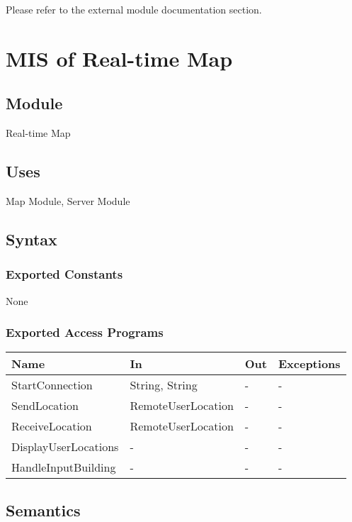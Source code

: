 \documentclass[12pt, titlepage]{article}
\begin{document}
Please refer to the external module documentation section.
 
\newpage

\section{MIS of Real-time Map} \label{mRealTimeMap}

\subsection{Module}

Real-time Map

\subsection{Uses}

Map Module, Server Module

\subsection{Syntax}

\subsubsection{Exported Constants}

None

\subsubsection{Exported Access Programs}

\begin{center}
\begin{tabular}{p{4cm} p{4cm} p{3cm} p{3cm}}
\hline
\textbf{Name} & \textbf{In} & \textbf{Out} & \textbf{Exceptions} \\
\hline
StartConnection & String, String & - & - \\
SendLocation & RemoteUserLocation & - & - \\
ReceiveLocation & RemoteUserLocation & - & - \\
DisplayUserLocations & - & - & - \\
HandleInputBuilding & - & - & - \\

\hline
\end{tabular}
\end{center}

\subsection{Semantics}
\end{document}
